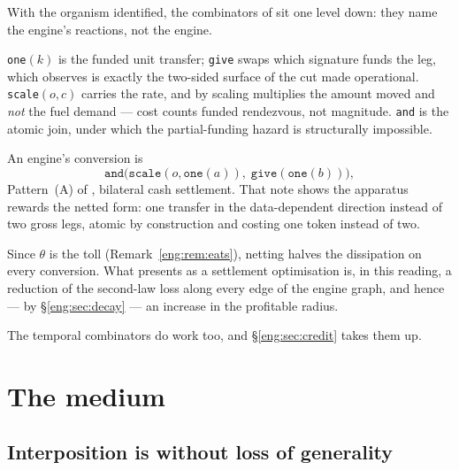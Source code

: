 With the organism identified, the combinators of \cite{SPJ2000} sit one
level down: they name the engine's reactions, not the engine.

\texttt{one}$(k)$ is the funded unit transfer; \texttt{give} swaps which
signature funds the leg, which \cite[\S3.1]{finrho} observes is exactly the
two-sided surface of the cut made operational. \texttt{scale}$(o,c)$
carries the rate, and by \cite[\S3.6]{finrho} scaling multiplies the amount
moved and \emph{not} the fuel demand --- cost counts funded rendezvous, not
magnitude. \texttt{and} is the atomic join, under which the partial-funding
hazard is structurally impossible.

\begin{observation}\label{eng:swap-netted-futures-shape}
An engine's conversion is
\[
  \texttt{and}\bigl(\texttt{scale}(o,\texttt{one}(a)),\;
                    \texttt{give}(\texttt{one}(b))\bigr),
\]
Pattern~(A) of \cite[Tab.~1]{finrho}, bilateral cash settlement. That
note shows the apparatus rewards the netted form: one transfer in the
data-dependent direction instead of two gross legs, atomic by construction
and costing one token instead of two.
\end{observation}

\begin{corollary}\label{eng:netting-thermodynamic}
Since $\theta$ is the toll (Remark~\ref{eng:rem:eats}), netting halves the
dissipation on every conversion. What \cite{finrho} presents as a
settlement optimisation is, in this reading, a reduction of the second-law
loss along every edge of the engine graph, and hence --- by
\S\ref{eng:sec:decay} --- an increase in the profitable radius.
\end{corollary}

The temporal combinators do work too, and \S\ref{eng:sec:credit} takes them up.

\section{The medium}\label{eng:S5}
\label{eng:sec:medium}

\subsection{Interposition is without loss of generality}\label{eng:S5.1}


